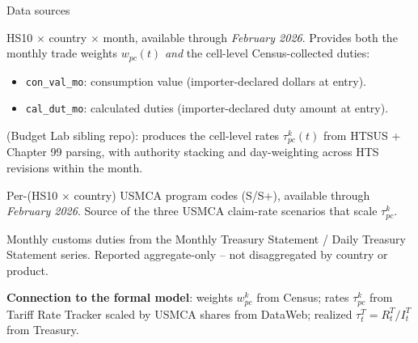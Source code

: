 \documentclass[aspectratio=169,10pt]{beamer}
\begin{document}
\begin{frame}{Data sources}

\small

\begin{description}\setlength{\itemsep}{0.4em}
  \item[\textbf{Census IMDB}] HS10 $\times$ country $\times$ month, available through \emph{February 2026}. Provides both the monthly trade weights $w_{pc}(t)$ \emph{and} the cell-level Census-collected duties:
    \begin{itemize}\small
      \item \texttt{con\_val\_mo}: consumption value (importer-declared dollars at entry).
      \item \texttt{cal\_dut\_mo}: calculated duties (importer-declared duty amount at entry).
    \end{itemize}

  \item[\textbf{Tariff Rate Tracker}] (Budget Lab sibling repo): produces the cell-level rates $\tau^{k}_{pc}(t)$ from HTSUS + Chapter 99 parsing, with authority stacking and day-weighting across HTS revisions within the month.

  \item[\textbf{USITC DataWeb}] Per-(HS10 $\times$ country) USMCA program codes (S/S+), available through \emph{February 2026}. Source of the three USMCA claim-rate scenarios that scale $\tau^{k}_{pc}$.

  \item[\textbf{U.S. Treasury}] Monthly customs duties from the Monthly Treasury Statement / Daily Treasury Statement series. \alert{Reported aggregate-only -- not disaggregated by country or product.}
\end{description}

\vspace{0.3em}

\textbf{Connection to the formal model}: weights $w^{k}_{pc}$ from Census; rates $\tau^{k}_{pc}$ from Tariff Rate Tracker scaled by USMCA shares from DataWeb; realized $\tau^{T}_t = R^{T}_t/I^{T}_t$ from Treasury.

\end{frame}
\end{document}
